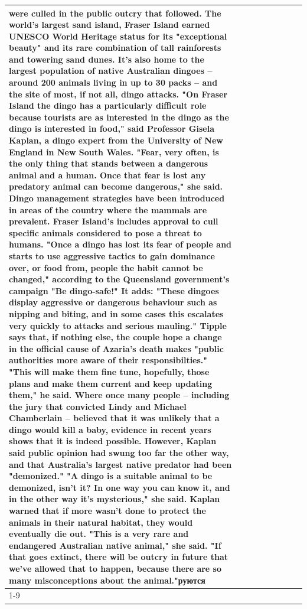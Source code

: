 \begin{table}[H]
\begin{tabular}{lllrlllll}
were culled in the public outcry that followed. The world's largest sand island, Fraser Island earned UNESCO World Heritage status for its "exceptional beauty" and its rare combination of tall rainforests and towering sand dunes. It's also home to the largest population of native Australian dingoes -- around 200 animals living in up to 30 packs -- and the site of most, if not all, dingo attacks. "On Fraser Island the dingo has a particularly difficult role because tourists are as interested in the dingo as the dingo is interested in food," said Professor Gisela Kaplan, a dingo expert from the University of New England in New South Wales. "Fear, very often, is the only thing that stands between a dangerous animal and a human. Once that fear is lost any predatory animal can become dangerous," she said. Dingo management strategies have been introduced in areas of the country where the mammals are prevalent. Fraser Island's includes approval to cull specific animals considered to pose a threat to humans. "Once a dingo has lost its fear of people and starts to use aggressive tactics to gain dominance over, or food from, people the habit cannot be changed," according to the Queensland government's campaign "Be dingo-safe!" It adds: "These dingoes display aggressive or dangerous behaviour such as nipping and biting, and in some cases this escalates very quickly to attacks and serious mauling." Tipple says that, if nothing else, the couple hope a change in the official cause of Azaria's death makes "public authorities more aware of their responsibilties." "This will make them fine tune, hopefully, those plans and make them current and keep updating them," he said. Where once many people -- including the jury that convicted Lindy and Michael Chamberlain -- believed that it was unlikely that a dingo would kill a baby, evidence in recent years shows that it is indeed possible. However, Kaplan said public opinion had swung too far the other way, and that Australia's largest native predator had been "demonized." "A dingo is a suitable animal to be demonized, isn't it? In one way you can know it, and in the other way it's mysterious," she said. Kaplan warned that if more wasn't done to protect the animals in their natural habitat, they would eventually die out. "This is a very rare and endangered Australian native animal," she said. "If that goes extinct, there will be outcry in future that we've allowed that to happen, because there are so many misconceptions about the animal."руются \\
\cline{1-9}

\end{tabular}
\end{table}
